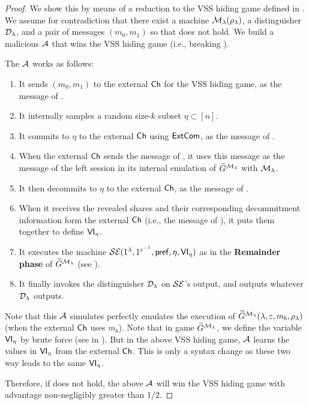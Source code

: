 \begin{proof}
    We show this by means of a reduction to the VSS hiding game defined in . We assume for contradiction that there exist a machine $\mathcal{M}_\lambda(\rho_\lambda)$, a distinguisher $\mathcal{D}_\lambda$, and a pair of messages $(m_0, m_1)$ so that  does not hold. We build a malicious $\mathcal{A}$ that wins the VSS hiding game (i.e., breaking ).

    The $\mathcal{A}$ works as follows:
    \begin{enumerate}
    \item
    It sends $(m_0, m_1)$ to the external $\mathsf{Ch}$ for the VSS hiding game, as the  message of .
    \item
    It internally samples a random size-$k$ subset $\eta \subset [n]$. 
    \item
    It commits to $\eta$ to the external $\mathsf{Ch}$ using $\mathsf{ExtCom}$, as the  message of .
    \item
    When the external $\mathsf{Ch}$ sends the  message of , it uses this message as the  message of the left session in its internal emulation of $\widetilde{G}^{\mathcal{M}_\lambda}$ with $\mathcal{M}_\lambda$.
    \item
    It then decommits to $\eta$ to the external $\mathsf{Ch}$, as the  message of .
    \item
    When it receives the revealed shares and their corresponding decommitment information form the external $\mathsf{Ch}$ (i.e., the  message of ), it puts them together to define $\mathsf{VI}_\eta$.
    \item
    It executes the machine $\mathcal{SE}(1^\lambda, 1^{\varepsilon^{-1}}, \mathsf{pref}, \eta, \mathsf{VI}_\eta)$ as in the {\bf Remainder phase} of $\widetilde{G}^{\mathcal{M}_\lambda}$ (see ).
    \item
    It finally invokes the distinguisher $\mathcal{D}_\lambda$ on $\mathcal{SE}$'s output, and outputs whatever $\mathcal{D}_\lambda$ outputs.
    \end{enumerate}
Note that this $\mathcal{A}$ simulates perfectly emulates the execution of $\widetilde{G}^{\mathcal{M}_\lambda}(\lambda, \varepsilon, m_b, \rho_\lambda)$ (when the external $\mathsf{Ch}$ uses $m_b$). Note that in game $\widetilde{G}^{\mathcal{M}_\lambda}$, we define the variable $\mathsf{VI}_\eta$ by brute force (see  in ). But in the above VSS hiding game, $\mathcal{A}$ learns the values in $\mathsf{VI}_\eta$ from the external $\mathsf{Ch}$. This is only a syntax change as these two way leads to the same $\mathsf{VI}_\eta$. 

Therefore, if  does not hold, the above $\mathcal{A}$ will win the VSS hiding game with advantage non-negligibly greater than $1/2$.

\end{proof}


